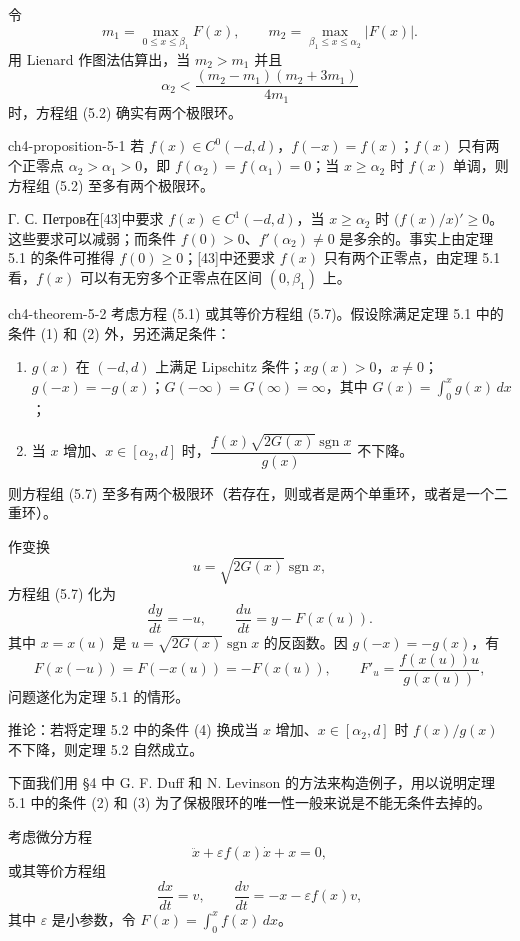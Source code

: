 令
\[
m_1=\max_{0\leqslant x\leqslant\beta_1}F(x),\qquad
m_2=\max_{\beta_1\leqslant x\leqslant\alpha_2}|F(x)|.
\]
用 Lienard 作图法估算出，当 $m_2>m_1$ 并且
\[
\alpha_2<\dfrac{(m_2-m_1)(m_2+3m_1)}{4m_1}
\]
时，方程组 (5.2) 确实有两个极限环。

\begin{proposition}{ }{ch4-proposition-5-1}
若 $f(x)\in C^0(-d,d)$，$f(-x)=f(x)$；$f(x)$ 只有两个正零点 $\alpha_2>\alpha_1>0$，即 $f(\alpha_2)=f(\alpha_1)=0$；当 $x\geqslant\alpha_2$ 时 $f(x)$ 单调，则方程组 (5.2) 至多有两个极限环。
\end{proposition}

Г. С. Петров在[43]中要求 $f(x)\in C^1(-d,d)$，当 $x\geqslant\alpha_2$ 时 $\bigl(f(x)/x\bigr)'\geqslant0$。这些要求可以减弱；而条件 $f(0)>0$、$f'(\alpha_2)\ne0$ 是多余的。事实上由定理 5.1 的条件可推得 $f(0)\geqslant0$；[43]中还要求 $f(x)$ 只有两个正零点，由定理 5.1 看，$f(x)$ 可以有无穷多个正零点在区间 $(0,\beta_1)$ 上。

\begin{theorem}{ }{ch4-theorem-5-2}
考虑方程 (5.1) 或其等价方程组 (5.7)。假设除满足定理 5.1 中的条件 (1) 和 (2) 外，另还满足条件：
\begin{enumerate}
  \item $g(x)$ 在 $(-d,d)$ 上满足 Lipschitz 条件；$xg(x)>0$，$x\ne0$；$g(-x)=-g(x)$；$G(-\infty)=G(\infty)=\infty$，其中 $G(x)=\int_0^xg(x)\,dx$；
  \item 当 $x$ 增加、$x\in[\alpha_2,d]$ 时，$\dfrac{f(x)\sqrt{2G(x)}\operatorname{sgn}x}{g(x)}$ 不下降。
\end{enumerate}
则方程组 (5.7) 至多有两个极限环（若存在，则或者是两个单重环，或者是一个二重环）。
\end{theorem}

作变换
\[
u=\sqrt{2G(x)}\operatorname{sgn}x,
\]
方程组 (5.7) 化为
\[
\dfrac{dy}{dt}=-u,\qquad \dfrac{du}{dt}=y-F(x(u)).
\]
其中 $x=x(u)$ 是 $u=\sqrt{2G(x)}\operatorname{sgn}x$ 的反函数。因 $g(-x)=-g(x)$，有
\[
F(x(-u))=F(-x(u))=-F(x(u)),\qquad F'_u=\dfrac{f(x(u))u}{g(x(u))},
\]
问题遂化为定理 5.1 的情形。

推论：若将定理 5.2 中的条件 (4) 换成当 $x$ 增加、$x\in[\alpha_2,d]$ 时 $f(x)/g(x)$ 不下降，则定理 5.2 自然成立。

下面我们用 \S4 中 G. F. Duff 和 N. Levinson 的方法来构造例子，用以说明定理 5.1 中的条件 (2) 和 (3) 为了保极限环的唯一性一般来说是不能无条件去掉的。

考虑微分方程
\begin{equation}
\ddot{x}+\varepsilon f(x)\dot{x}+x=0,\tag{5.24}
\end{equation}
或其等价方程组
\begin{equation}
\dfrac{dx}{dt}=v,\qquad \dfrac{dv}{dt}=-x-\varepsilon f(x)v,\tag{5.25}
\end{equation}
其中 $\varepsilon$ 是小参数，令 $F(x)=\int_0^xf(x)\,dx$。

